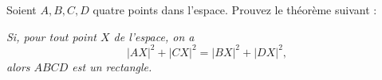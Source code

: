 Soient $A, B, C, D$ quatre points dans l'espace. Prouvez le théorème
suivant :

\emph{Si, pour tout point $X$ de l'espace, on a}
\[
|AX|^2 + |CX|^2 = |BX|^2 + |DX|^2,
\]
\emph{alors $ABCD$ est un rectangle.}
